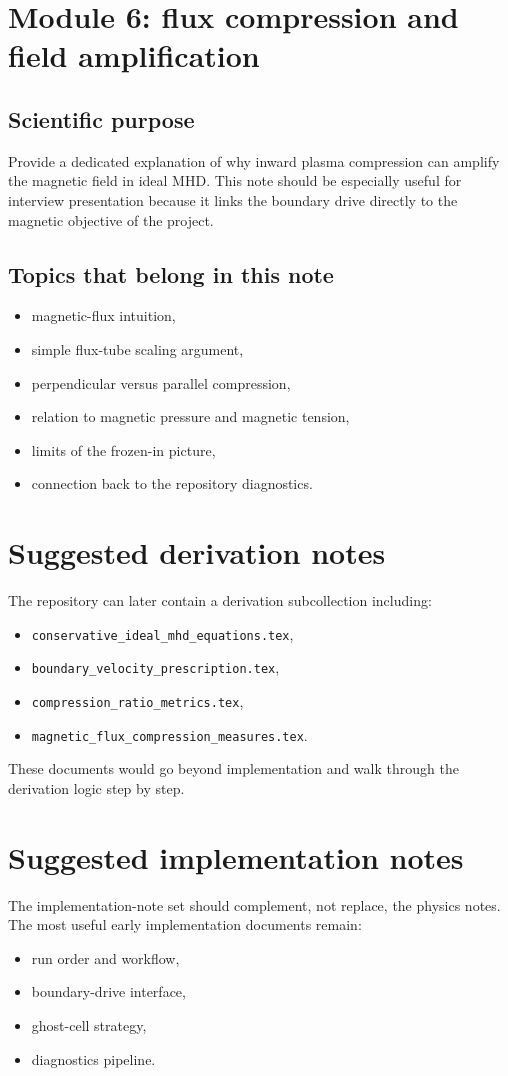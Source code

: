 \documentclass[11pt]{article}
\begin{document}
\section{Module 6: flux compression and field amplification}
\subsection{Scientific purpose}
Provide a dedicated explanation of why inward plasma compression can amplify the magnetic field in ideal MHD. This note should be especially useful for interview presentation because it links the boundary drive directly to the magnetic objective of the project.

\subsection{Topics that belong in this note}
\begin{itemize}[leftmargin=1.8em]
    \item magnetic-flux intuition,
    \item simple flux-tube scaling argument,
    \item perpendicular versus parallel compression,
    \item relation to magnetic pressure and magnetic tension,
    \item limits of the frozen-in picture,
    \item connection back to the repository diagnostics.
\end{itemize}

\section{Suggested derivation notes}
The repository can later contain a derivation subcollection including:
\begin{itemize}[leftmargin=1.8em]
    \item \texttt{conservative\_ideal\_mhd\_equations.tex},
    \item \texttt{boundary\_velocity\_prescription.tex},
    \item \texttt{compression\_ratio\_metrics.tex},
    \item \texttt{magnetic\_flux\_compression\_measures.tex}.
\end{itemize}
These documents would go beyond implementation and walk through the derivation logic step by step.

\section{Suggested implementation notes}
The implementation-note set should complement, not replace, the physics notes. The most useful early implementation documents remain:
\begin{itemize}[leftmargin=1.8em]
    \item run order and workflow,
    \item boundary-drive interface,
    \item ghost-cell strategy,
    \item diagnostics pipeline.
\end{itemize}
\end{document}
